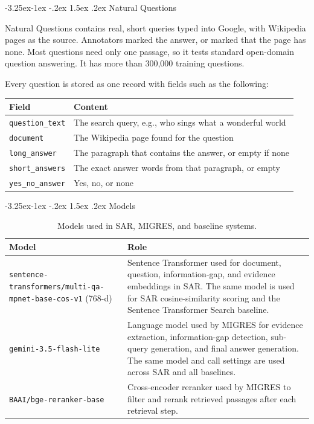 \documentclass[12pt,a4paper]{report}
\makeatletter
\renewcommand\subsection{\@startsection{subsection}{2}{\z@}%
    {-3.25ex\@plus -1ex \@minus -.2ex}%
    {1.5ex \@plus .2ex}%
    {\normalfont\fontsize{14}{17}\selectfont\bfseries}}
\renewcommand\subsubsection{\@startsection{subsubsection}{3}{\z@}%
    {-3.25ex\@plus -1ex \@minus -.2ex}%
    {1.5ex \@plus .2ex}%
    {\normalfont\fontsize{12}{15}\selectfont\bfseries}}
\makeatother
\begin{document}
\subsubsection{Natural Questions}

Natural Questions \cite{kwiatkowski2019natural} contains real, short queries typed into Google, with Wikipedia pages as the source. Annotators marked the answer, or marked that the page has none. Most questions need only one passage, so it tests standard open-domain question answering. It has more than 300,000 training questions.

Every question is stored as one record with fields such as the following:

\begin{center}
\begin{tabular}{|p{1.6in}|p{4.4in}|}
\hline
\textbf{Field} & \textbf{Content} \\ \hline
\texttt{question\_text} & The search query, e.g., who sings what a wonderful world \\ \hline
\texttt{document} & The Wikipedia page found for the question \\ \hline
\texttt{long\_answer} & The paragraph that contains the answer, or empty if none \\ \hline
\texttt{short\_answers} & The exact answer words from that paragraph, or empty \\ \hline
\texttt{yes\_no\_answer} & Yes, no, or none \\ \hline
\end{tabular}
\end{center}

\subsection{Models}

\begin{table}[H]
\centering
\caption{Models used in SAR, MIGRES, and baseline systems.}
\label{tab:models}
\renewcommand{\arraystretch}{1.25}
\begin{tabular}{|p{5.0cm}|p{8.0cm}|}
\hline
\textbf{Model} & \textbf{Role} \\
\hline
\texttt{sentence-transformers/\allowbreak multi-qa-mpnet-\allowbreak base-cos-v1} (768-d) &
Sentence Transformer \cite{reimers2019sentence,song2020mpnet,st2020mpnet} used for document, question, information-gap, and evidence embeddings in SAR. The same model is used for SAR cosine-similarity scoring and the Sentence Transformer Search baseline. \\
\hline
\texttt{gemini-3.5-flash-lite} &
Language model \cite{gemini2023} used by MIGRES for evidence extraction, information-gap detection, sub-query generation, and final answer generation. The same model and call settings are used across SAR and all baselines. \\
\hline
\texttt{BAAI/bge-reranker-base} &
Cross-encoder reranker \cite{nogueira2019passage,xiao2024cpack} used by MIGRES to filter and rerank retrieved passages after each retrieval step. \\
\hline
\end{tabular}
\end{table}
\end{document}
